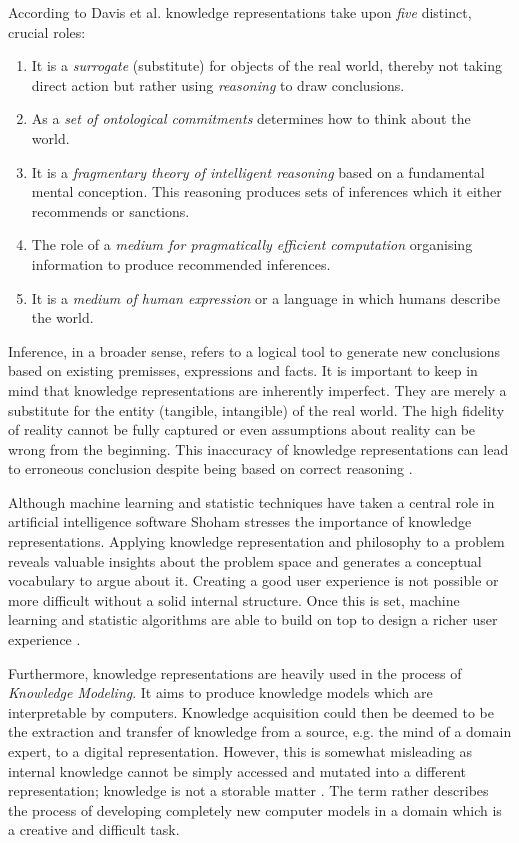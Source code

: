 According to Davis et al. \cite{Davis1993b} knowledge representations take upon \textit{five} distinct, crucial roles:
\begin{enumerate}
\item It is a \textit{surrogate} (substitute) for objects of the real world, thereby not taking direct action but rather using \textit{reasoning} to draw conclusions.
\item As a \textit{set of ontological commitments} determines how to think about the world.
\item It is a \textit{fragmentary theory of intelligent reasoning} based on a fundamental mental conception. This reasoning produces sets of inferences which it either recommends or sanctions.
\item The role of a \textit{medium for pragmatically efficient computation} organising information to produce recommended inferences.
\item It is a \textit{medium of human expression} or a language in which humans describe the world.
\end{enumerate}
Inference, in a broader sense, refers to a logical tool to generate new conclusions based on existing premisses, expressions and facts.
It is important to keep in mind that knowledge representations are inherently imperfect.
They are merely a substitute for the entity (tangible, intangible) of the real world.
The high fidelity of reality cannot be fully captured or even assumptions about reality can be wrong from the beginning.
This inaccuracy of knowledge representations can lead to erroneous conclusion despite being based on correct reasoning \cite{Davis1993b}.

Although machine learning and statistic techniques have taken a central role in artificial intelligence software Shoham \cite{Shoham2015b} stresses the importance of knowledge representations.
Applying knowledge representation and philosophy to a problem reveals valuable insights about the problem space and generates a conceptual vocabulary to argue about it.
Creating a good user experience is not possible or more difficult without a solid internal structure.
Once this is set, machine learning and statistic algorithms are able to build on top to design a richer user experience \cite{Shoham2015b}.

Furthermore, knowledge representations are heavily used in the process of \textit{Knowledge Modeling}.
It aims to produce knowledge models which are interpretable by computers.
Knowledge acquisition could then be deemed to be the extraction and transfer of knowledge from a source, e.g. the mind of a domain expert, to a digital representation.
However, this is somewhat misleading as internal knowledge cannot be simply accessed and mutated into a different representation; knowledge is not a storable matter \cite{Clancey1989a}.
The term rather describes the process of developing completely new computer models in a domain which is a creative and difficult task.

